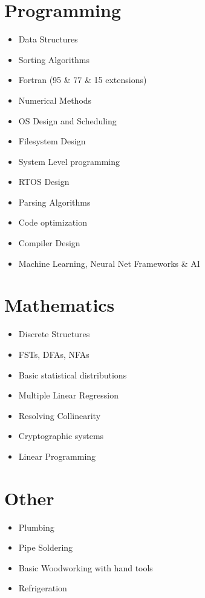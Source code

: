 \documentclass[a4paper]{article}
\begin{document}
\section{Programming}
\begin{itemize}
\item Data Structures
\item Sorting Algorithms
\item Fortran (95 \& 77 \& 15 extensions)
\item Numerical Methods
\item OS Design and Scheduling
\item Filesystem Design
\item System Level programming
\item RTOS Design
\item Parsing Algorithms
\item Code optimization
\item Compiler Design
\item Machine Learning, Neural Net Frameworks \& AI
\end{itemize}

\section{Mathematics}
\begin{itemize}
\item Discrete Structures
\item FSTs, DFAs, NFAs
\item Basic statistical distributions
\item Multiple Linear Regression
\item Resolving Collinearity
\item Cryptographic systems
\item Linear Programming
\end{itemize}

\section{Other}
\begin{itemize}
\item Plumbing
\item Pipe Soldering
\item Basic Woodworking with hand tools
\item Refrigeration
\end{itemize}
\end{document}
